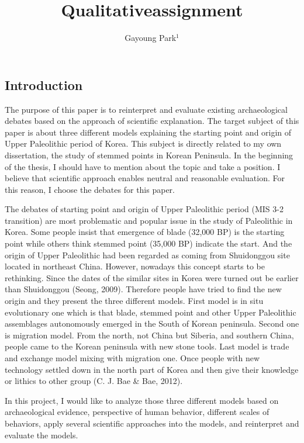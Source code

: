 \documentclass[american,man]{apa6}
\title{Qualitativeassignment}
\author{Gayoung Park\(^1\)}
\affiliation{\vspace{0.5cm}\(^1\)University of Washington}
\begin{document}
\maketitle

\subsection{Introduction}\label{introduction}

The purpose of this paper is to reinterpret and evaluate existing
archaeological debates based on the approach of scientific explanation.
The target subject of this paper is about three different models
explaining the starting point and origin of Upper Paleolithic period of
Korea. This subject is directly related to my own dissertation, the
study of stemmed points in Korean Peninsula. In the beginning of the
thesis, I should have to mention about the topic and take a position. I
believe that scientific approach enables neutral and reasonable
evaluation. For this reason, I choose the debates for this paper.

The debates of starting point and origin of Upper Paleolithic period
(MIS 3-2 transition) are most problematic and popular issue in the study
of Paleolithic in Korea. Some people insist that emergence of blade
(32,000 BP) is the starting point while others think stemmed point
(35,000 BP) indicate the start. And the origin of Upper Paleolithic had
been regarded as coming from Shuidonggou site located in northeast
China. However, nowadays this concept starts to be rethinking. Since the
dates of the similar sites in Korea were turned out be earlier than
Shuidonggou (Seong, 2009). Therefore people have tried to find the new
origin and they present the three different models. First model is in
situ evolutionary one which is that blade, stemmed point and other Upper
Paleolithic assemblages autonomously emerged in the South of Korean
peninsula. Second one is migration model. From the north, not China but
Siberia, and southern China, people came to the Korean peninsula with
new stone tools. Last model is trade and exchange model mixing with
migration one. Once people with new technology settled down in the north
part of Korea and then give their knowledge or lithics to other group
(C. J. Bae \& Bae, 2012).

In this project, I would like to analyze those three different models
based on archaeological evidence, perspective of human behavior,
different scales of behaviors, apply several scientific approaches into
the models, and reinterpret and evaluate the models.
\end{document}
